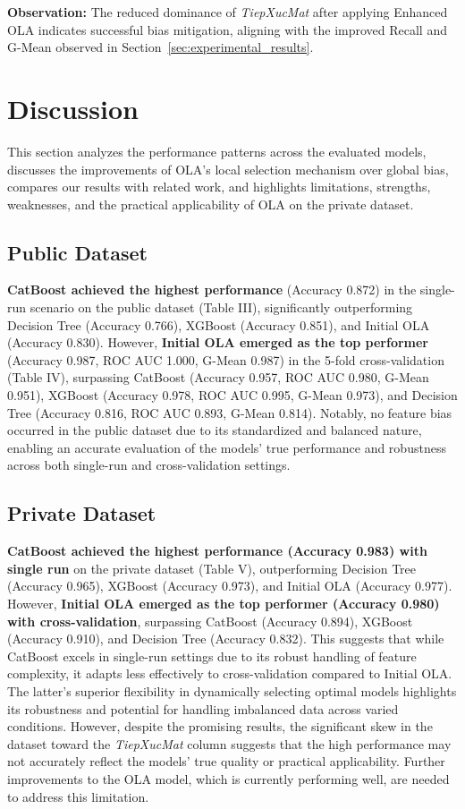 \documentclass[conference]{IEEEtran}
\begin{document}
\noindent\textbf{Observation:} The reduced dominance of \textit{TiepXucMat} after applying Enhanced OLA indicates successful bias mitigation, aligning with the improved Recall and G-Mean observed in Section~\ref{sec:experimental_results}.


\section{Discussion}
This section analyzes the performance patterns across the evaluated models, discusses the improvements of OLA's local selection mechanism over global bias, compares our results with related work, and highlights limitations, strengths, weaknesses, and the practical applicability of OLA on the private dataset.

\subsection{Public Dataset} \textbf{CatBoost achieved the highest performance} (Accuracy 0.872) in the single-run scenario on the public dataset (Table III), significantly outperforming Decision Tree (Accuracy 0.766), XGBoost (Accuracy 0.851), and Initial OLA (Accuracy 0.830). However, \textbf{Initial OLA emerged as the top performer} (Accuracy 0.987, ROC AUC 1.000, G-Mean 0.987) in the 5-fold cross-validation (Table IV), surpassing CatBoost (Accuracy 0.957, ROC AUC 0.980, G-Mean 0.951), XGBoost (Accuracy 0.978, ROC AUC 0.995, G-Mean 0.973), and Decision Tree (Accuracy 0.816, ROC AUC 0.893, G-Mean 0.814). Notably, no feature bias occurred in the public dataset due to its standardized and balanced nature, enabling an accurate evaluation of the models’ true performance and robustness across both single-run and cross-validation settings.

\subsection{Private Dataset} \textbf{CatBoost achieved the highest performance (Accuracy 0.983) with single run} on the private dataset (Table V), outperforming Decision Tree (Accuracy 0.965), XGBoost (Accuracy 0.973), and Initial OLA (Accuracy 0.977). However, \textbf{Initial OLA emerged as the top performer (Accuracy 0.980) with cross-validation}, surpassing CatBoost (Accuracy 0.894), XGBoost (Accuracy 0.910), and Decision Tree (Accuracy 0.832). This suggests that while CatBoost excels in single-run settings due to its robust handling of feature complexity, it adapts less effectively to cross-validation compared to Initial OLA. The latter’s superior flexibility in dynamically selecting optimal models highlights its robustness and potential for handling imbalanced data across varied conditions. However, despite the promising results, the significant skew in the dataset toward the \textit{TiepXucMat} column suggests that the high performance may not accurately reflect the models’ true quality or practical applicability. Further improvements to the OLA model, which is currently performing well, are needed to address this limitation.
\end{document}
